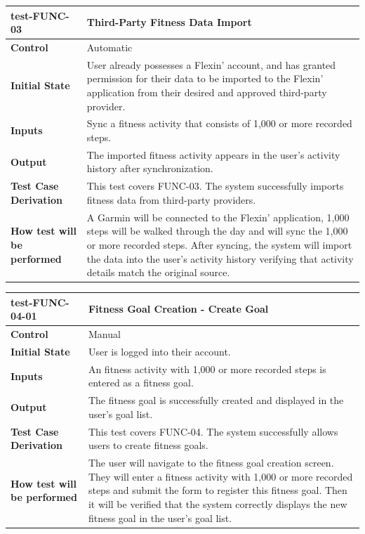 \documentclass[12pt, titlepage]{article}
\begin{document}
\vspace{1em}

\noindent\begin{tabularx}{\textwidth}{>{\raggedright\arraybackslash}p{3.5cm}X}
  \toprule
  \textbf{test-FUNC-03} & \textbf{Third-Party Fitness Data Import}\\
  \midrule
  \textbf{Control} & Automatic\\
  \textbf{Initial State} & User already possesses a Flexin' account, and has granted permission for their data to be imported to the Flexin' application from their desired and approved third-party provider.\\
  \textbf{Inputs} & Sync a fitness activity that consists of 1,000 or more recorded steps.\\
  \textbf{Output} & The imported fitness activity appears in the user's activity history after synchronization.\\
  \textbf{Test Case Derivation} & This test covers FUNC-03. The system successfully imports fitness data from third-party providers.\\
  \textbf{How test will be performed} & A Garmin will be connected to the Flexin' application, 1,000 steps will be walked through the day and will sync the 1,000 or more recorded steps. After syncing, the system will import the data into the user's activity history verifying that activity details match the original source.\\
  \bottomrule
\end{tabularx}

\vspace{1em}

\noindent\begin{tabularx}{\textwidth}{>{\raggedright\arraybackslash}p{3.5cm}X}
  \toprule
  \textbf{test-FUNC-04-01} & \textbf{Fitness Goal Creation - Create Goal}\\
  \midrule
  \textbf{Control} & Manual\\
  \textbf{Initial State} & User is logged into their account.\\
  \textbf{Inputs} & An fitness activity with 1,000 or more recorded steps is entered as a fitness goal.\\
  \textbf{Output} & The fitness goal is successfully created and displayed in the user's goal list.\\
  \textbf{Test Case Derivation} & This test covers FUNC-04. The system successfully allows users to create fitness goals.\\
  \textbf{How test will be performed} & The user will navigate to the fitness goal creation screen. They will enter a fitness activity with 1,000 or more recorded steps and submit the form to register this fitness goal. Then it will be verified that the system correctly displays the new fitness goal in the user's goal list.\\
  \bottomrule
\end{tabularx}
\end{document}
